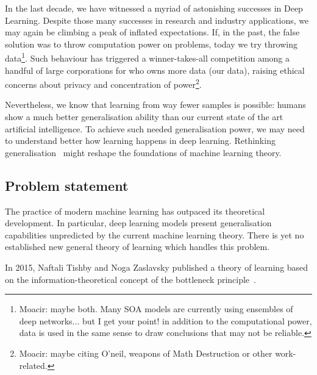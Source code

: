 
In the last decade, we have witnessed a myriad of astonishing successes in Deep Learning. Despite those many successes in research and industry applications, we may again be climbing a peak of inflated expectations. If, in the past, the false solution was to throw computation power on problems, today we try throwing data\footnote{Moacir: maybe both. Many SOA models are currently using ensembles of deep networks... but I get your point! in addition to the computational power, data is used in the same sense to draw conclusions that may not be reliable.}. Such behaviour has triggered a winner-takes-all competition among a handful of large corporations for who owns more data (our data), raising ethical concerns about privacy and concentration of power\cite{oneil:2016}\footnote{Moacir: maybe citing O'neil, weapons of Math Destruction or other work-related.}.

Nevertheless, we know that learning from way fewer samples is possible: humans show a much better generalisation ability than our current state of the art artificial intelligence. To achieve such needed generalisation power, we may need to understand better how learning happens in deep learning. Rethinking generalisation~\cite{zhang:2016} might reshape the foundations of machine learning theory.

\subsection{Problem statement} The practice of modern machine learning has outpaced its theoretical development. In particular, deep learning models present generalisation capabilities unpredicted by the current machine learning theory. There is yet no established new general theory of learning which handles this problem.

In 2015, Naftali Tishby and Noga Zaslavsky published a theory of learning based on the information-theoretical concept of the bottleneck principle~\cite{tishby:2015dlib}.

